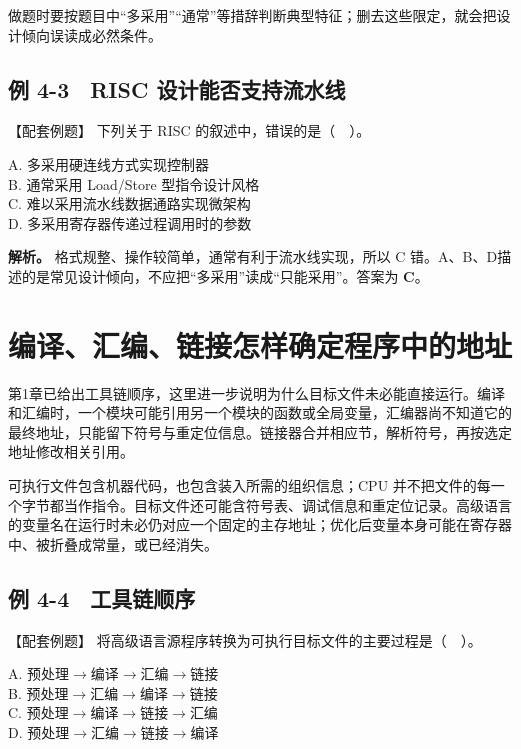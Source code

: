 做题时要按题目中``多采用''``通常''等措辞判断典型特征；删去这些限定，就会把设计倾向误读成必然条件。

\subsection{例 4-3　RISC 设计能否支持流水线}\label{CO04-08}

\begin{example}[配套例题]

【配套例题】 下列关于 RISC 的叙述中，错误的是（　）。

A. 多采用硬连线方式实现控制器\\
B. 通常采用 Load/Store 型指令设计风格\\
C. 难以采用流水线数据通路实现微架构\\
D. 多采用寄存器传递过程调用时的参数

\end{example}

\textbf{解析。} 格式规整、操作较简单，通常有利于流水线实现，所以 C 错。A、B、D描述的是常见设计倾向，不应把``多采用''读成``只能采用''。答案为 \textbf{C}。

\section{编译、汇编、链接怎样确定程序中的地址}\label{CO04-09}

第1章已给出工具链顺序，这里进一步说明为什么目标文件未必能直接运行。编译和汇编时，一个模块可能引用另一个模块的函数或全局变量，汇编器尚不知道它的最终地址，只能留下符号与重定位信息。链接器合并相应节，解析符号，再按选定地址修改相关引用。

可执行文件包含机器代码，也包含装入所需的组织信息；CPU 并不把文件的每一个字节都当作指令。目标文件还可能含符号表、调试信息和重定位记录。高级语言的变量名在运行时未必仍对应一个固定的主存地址；优化后变量本身可能在寄存器中、被折叠成常量，或已经消失。

\subsection{例 4-4　工具链顺序}\label{CO04-10}

\begin{example}[配套例题]

【配套例题】 将高级语言源程序转换为可执行目标文件的主要过程是（　）。

A. 预处理\ensuremath{\to}编译\ensuremath{\to}汇编\ensuremath{\to}链接\\
B. 预处理\ensuremath{\to}汇编\ensuremath{\to}编译\ensuremath{\to}链接\\
C. 预处理\ensuremath{\to}编译\ensuremath{\to}链接\ensuremath{\to}汇编\\
D. 预处理\ensuremath{\to}汇编\ensuremath{\to}链接\ensuremath{\to}编译

\end{example}

